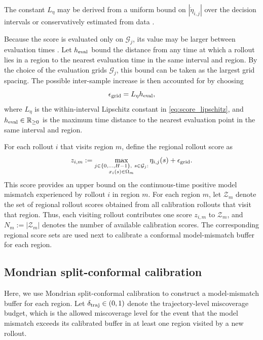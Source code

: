 \documentclass[letterpaper,10pt,conference]{ieeeconf}
\newcommand{\xv}{x}
\begin{document}
The constant $L_\eta$ may be derived from a uniform bound on
$|\dot\eta_{i,j}|$ over the decision intervals or conservatively estimated
from data \cite{wood1996estimation}.

Because the score is evaluated only on $\mathcal G_j$, its value may be larger
between evaluation times \cite{breeden2022sampled}. Let $h_{\rm eval}$ bound
the distance from any time at which a rollout lies in a region to the nearest
evaluation time in the same interval and region. By the choice of the evaluation grids $\mathcal G_j$, this bound can be taken as the largest grid spacing.
The possible inter-sample increase is then accounted for by choosing
\begin{equation}
    \epsilon_{\rm grid} = L_\eta h_{\rm eval},
    \label{eq:grid_margin}
\end{equation}
where $L_\eta$ is the within-interval Lipschitz constant in
\eqref{eq:score_lipschitz}, and $h_{\rm eval}\in\mathbb{R}_{\geq 0}$ is the
maximum time distance to the nearest evaluation point in the same interval
and region.


For each rollout $i$ that visits region $m$, define the regional rollout score
as
\begin{equation}
    z_{i,m}
    :=
    \max_{\substack{j\in\{0,\ldots,H-1\},\ s\in\mathcal G_j:\\
    \xv_i(s)\in\Omega_m}}
    \eta_{i,j}(s)
    +\epsilon_{\rm grid}.
    \label{eq:rollout_score}
\end{equation}
This score provides an upper bound on the continuous-time positive model mismatch
experienced by rollout $i$ in region $m$. For each region $m$, let
$\mathcal Z_m$ denote the set of regional rollout scores obtained from all
calibration rollouts that visit that region. Thus, each visiting rollout
contributes one score $z_{i,m}$ to $\mathcal Z_m$, and
$N_m:=|\mathcal Z_m|$ denotes the number of available calibration scores.
The corresponding regional score sets are used next to calibrate a conformal
model-mismatch buffer for each region.

\subsection{Mondrian split-conformal calibration}

Here, we use Mondrian split-conformal calibration to construct a model-mismatch
buffer for each region. Let $\delta_{\rm traj}\in(0,1)$ denote the
trajectory-level miscoverage budget, which is the allowed miscoverage level for
the event that the model mismatch exceeds its calibrated buffer in at least one
region visited by a new rollout.
\end{document}
